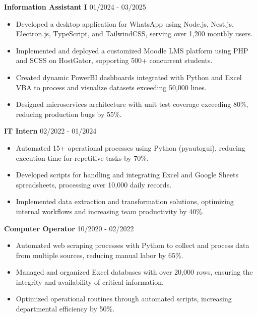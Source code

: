 \documentclass[a4paper,11pt]{article}
\begin{document}
\vspace{0.3em}
\noindent\textbf{Information Assistant I} \hfill {\color{light}\small 01/2024 - 03/2025}

\begin{itemize}[leftmargin=1.5em, itemsep=1pt, parsep=0pt, topsep=2pt]
  \item Developed a desktop application for WhatsApp using Node.js, Nest.js, Electron.js, TypeScript, and TailwindCSS, serving over 1,200 monthly users.
  \item Implemented and deployed a customized Moodle LMS platform using PHP and SCSS on HostGator, supporting 500+ concurrent students.
  \item Created dynamic PowerBI dashboards integrated with Python and Excel VBA to process and visualize datasets exceeding 50,000 lines.
  \item Designed microservices architecture with unit test coverage exceeding 80\%, reducing production bugs by 55\%.
\end{itemize}

\vspace{0.3em}
\noindent\textbf{IT Intern} \hfill {\color{light}\small 02/2022 - 01/2024}

\begin{itemize}[leftmargin=1.5em, itemsep=1pt, parsep=0pt, topsep=2pt]
  \item Automated 15+ operational processes using Python (pyautogui), reducing execution time for repetitive tasks by 70\%.
  \item Developed scripts for handling and integrating Excel and Google Sheets spreadsheets, processing over 10,000 daily records.
  \item Implemented data extraction and transformation solutions, optimizing internal workflows and increasing team productivity by 40\%.
\end{itemize}

\vspace{0.3em}
\noindent\textbf{Computer Operator} \hfill {\color{light}\small 10/2020 - 02/2022}

\begin{itemize}[leftmargin=1.5em, itemsep=1pt, parsep=0pt, topsep=2pt]
  \item Automated web scraping processes with Python to collect and process data from multiple sources, reducing manual labor by 65\%.
  \item Managed and organized Excel databases with over 20,000 rows, ensuring the integrity and availability of critical information.
  \item Optimized operational routines through automated scripts, increasing departmental efficiency by 50\%.
\end{itemize}
\end{document}
